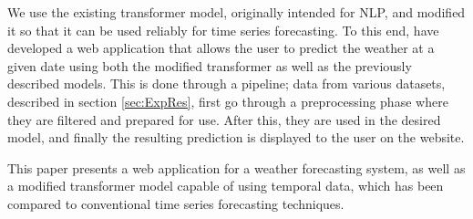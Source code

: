 We use the existing transformer model, originally intended for NLP, and modified it so that it can be used reliably for time series forecasting.
To this end, have developed a web application that allows the user to predict the weather at a given date using both the modified transformer as well as the previously described models.
This is done through a pipeline; data from various datasets, described in section \ref{sec:ExpRes}, first go through a preprocessing phase where they are filtered and prepared for use.
After this, they are used in the desired model, and finally the resulting prediction is displayed to the user on the website.  

This paper presents a web application for a weather forecasting system, as well as a modified transformer model capable of using temporal data, which has been compared to conventional time series forecasting techniques.